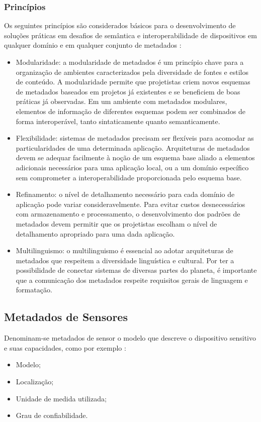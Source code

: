 		\subsubsection{Princípios}
    \quad Os seguintes princípios são considerados básicos para o desenvolvimento de soluções práticas em desafios de semântica
    e interoperabilidade de dispositivos em qualquer domínio e em qualquer conjunto de metadados \cite{metadata}:
		\begin{itemize}
		  \item Modularidade: a modularidade de metadados é um princípio chave para a organização de ambientes caracterizados pela diversidade de fontes e estilos
      de conteúdo. A modularidade permite que projetistas criem novos esquemas de metadados baseados em projetos
      já existentes e se beneficiem de boas práticas já observadas. Em um ambiente com metadados modulares, elementos de informação de diferentes esquemas
      podem ser combinados de forma interoperável, tanto sintaticamente quanto semanticamente.
      \item Flexibilidade: sistemas de metadados precisam ser flexíveis para acomodar as particularidades de uma determinada aplicação.
      Arquiteturas de metadados devem se adequar facilmente à noção de um esquema base aliado a elementos adicionais necessários para uma aplicação local, ou a um
      domínio específico sem comprometer a interoperabilidade proporcionada pelo esquema base.
      \item Refinamento: o nível de detalhamento necessário para cada domínio de aplicação pode variar consideravelmente. Para evitar custos
      desnecessários com armazenamento e processamento, o desenvolvimento dos padrões de metadados devem permitir que os projetistas
      escolham o nível de detalhamento apropriado para uma dada aplicação.
      \item Multilinguismo: o multilinguismo é essencial ao adotar arquiteturas de metadados que respeitem a diversidade linguística e cultural.
      Por ter a possibilidade de conectar sistemas de diversas partes do planeta, é importante que a comunicação dos metadados respeite requisitos gerais de linguagem e formatação.
		\end{itemize}
  \subsection{Metadados de Sensores}
    \quad Denominam-se metadados de sensor o modelo que descreve o dispositivo sensitivo e suas capacidades, como por exemplo \cite{SML}:
    \begin{itemize}
      \item Modelo;
      \item Localização;
      \item Unidade de medida utilizada;
      \item Grau de confiabilidade.
    \end{itemize}

